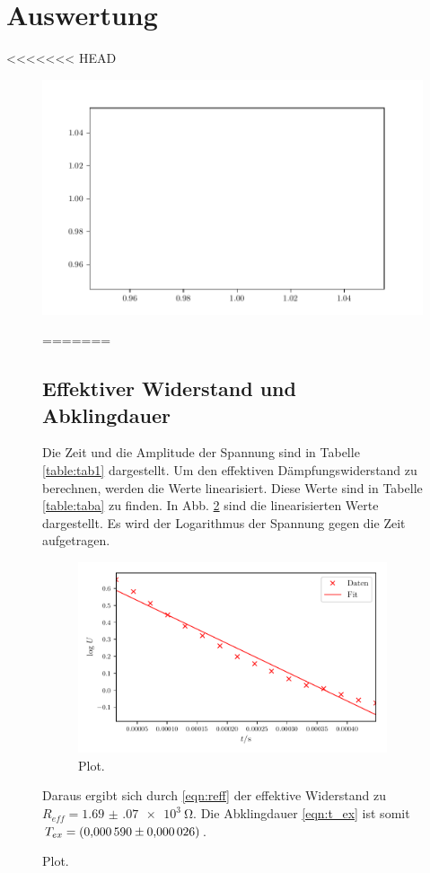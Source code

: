 \section{Auswertung}
\label{sec:Auswertung}

<<<<<<< HEAD
\begin{figure}
  \centering
  \includegraphics{plot.pdf}
  \caption{Plot }
  \label{fig:plot}
=======
\subsection{Effektiver Widerstand und Abklingdauer} 
Die Zeit und die Amplitude der Spannung sind in Tabelle
\ref{table:tab1} dargestellt. Um den effektiven Dämpfungswiderstand
zu berechnen, werden die Werte linearisiert. Diese Werte sind in
Tabelle \ref{table:taba} zu finden. In Abb. \ref{fig:plota}
sind die linearisierten Werte dargestellt. Es wird der
Logarithmus der Spannung gegen die Zeit aufgetragen.


\begin{figure}
  \centering
  \includegraphics{build/plota.pdf}
  \caption{Plot.}
  \label{fig:plota}
\end{figure}
\noindent Daraus ergibt sich durch \eqref{eqn:reff}%
der effektive Widerstand zu $R_{eff} = \SI{1.69(07)e3}{\ohm}$. %
Die Abklingdauer \ref{eqn:t_ex} ist somit $T_{ex} = \SI{0.000590 \pm 0.000026}{}$. %


\end{figure}
